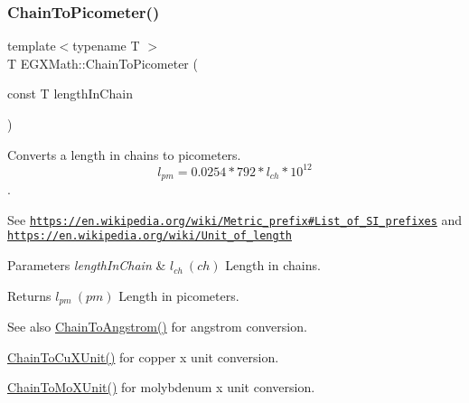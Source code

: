 \subsubsection{\texorpdfstring{Chain\+To\+Picometer()}{ChainToPicometer()}}
{\footnotesize\ttfamily template$<$typename T $>$ \\
T E\+G\+X\+Math\+::\+Chain\+To\+Picometer (\begin{DoxyParamCaption}\item[{const T}]{length\+In\+Chain }\end{DoxyParamCaption})}



Converts a length in chains to picometers. \[ l_{pm}=0.0254 * 792 * l_{ch} * 10^{12} \]. 

See \href{https://en.wikipedia.org/wiki/Metric_prefix#List_of_SI_prefixes}{\tt https\+://en.\+wikipedia.\+org/wiki/\+Metric\+\_\+prefix\#\+List\+\_\+of\+\_\+\+S\+I\+\_\+prefixes} and \href{https://en.wikipedia.org/wiki/Unit_of_length}{\tt https\+://en.\+wikipedia.\+org/wiki/\+Unit\+\_\+of\+\_\+length} 
\begin{DoxyParams}{Parameters}
{\em length\+In\+Chain} & $ l_{ch}\ (ch)$ Length in chains. \\
\hline
\end{DoxyParams}
\begin{DoxyReturn}{Returns}
$ l_{pm}\ (pm)$ Length in picometers. 
\end{DoxyReturn}
\begin{DoxySeeAlso}{See also}
\mbox{\hyperlink{group___e_g_x_math-_conversions-_length_conversions-_surveyors-_chain-_non-_s_i_ga89e870762310908510aad80d26dc1942}{Chain\+To\+Angstrom()}} for angstrom conversion. 

\mbox{\hyperlink{group___e_g_x_math-_conversions-_length_conversions-_surveyors-_chain-_non-_s_i_ga4d49e29ef32b64b7a433ffe76447cf5f}{Chain\+To\+Cu\+X\+Unit()}} for copper x unit conversion. 

\mbox{\hyperlink{group___e_g_x_math-_conversions-_length_conversions-_surveyors-_chain-_non-_s_i_gae4a2b99d846db53416e9fc5d6f9e957c}{Chain\+To\+Mo\+X\+Unit()}} for molybdenum x unit conversion. 
\end{DoxySeeAlso}
\mbox{\label{group___e_g_x_math-_conversions-_length_conversions-_surveyors-_chain-_s_i_ga8940f5211af58a3bf708412ad2d7ba96}} 
